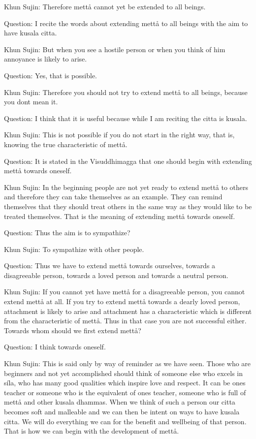 \documentclass[12pt,twoside]{article}
\begin{document}
Khun Sujin: Therefore mett{\aa} cannot yet be extended to all beings. 

Question: I recite the words about extending mett{\aa} to all beings
with the aim to have kusala citta. 

Khun Sujin: But when you see a hostile person or when you think of him
annoyance is likely to arise. 

Question: Yes, that is possible. 

Khun Sujin: Therefore you should not try to extend mett{\aa} to all
beings, because you don{\textquotesingle}t mean it. 

Question: I think that it is useful because while I am reciting the
citta is kusala. 

Khun Sujin: This is not possible if you do not start in the right way,
that is, knowing the true characteristic of mett{\aa}. 

Question: It is stated in the Visuddhimagga that one should begin with
extending mett{\aa} towards oneself. 

Khun Sujin: In the beginning people are not yet ready to extend
mett{\aa} to others and therefore they can take themselves as an
example. They can remind themselves that they should treat others in
the same way as they would like to be treated themselves. That is the
meaning of extending mett{\aa} towards oneself. 

Question: Thus the aim is to sympathize?

Khun Sujin: To sympathize with other people. 

Question: Thus we have to extend mett{\aa} towards ourselves, towards a
disagreeable person, towards a loved person and towards a neutral
person. 

Khun Sujin: If you cannot yet have mett{\aa} for a disagreeable person,
you cannot extend mett{\aa} at all. If you try to extend mett{\aa}
towards a dearly loved person, attachment is likely to arise and
attachment has a characteristic which is different from the
characteristic of mett{\aa}. Thus in that case you are not successful
either. Towards whom should we first extend mett{\aa}?

Question: I think towards oneself. 

Khun Sujin: This is said only by way of reminder as we have seen. Those
who are beginners and not yet accomplished should think of someone else
who excels in s\'ila, who has many good qualities which inspire love
and respect. It can be one{\textquotesingle}s teacher or someone who is
the equivalent of one{\textquotesingle}s teacher, someone who is full
of mett{\aa} and other kusala dhammas. When we think of such a person
our citta becomes soft and malleable and we can then be intent on ways
to have kusala citta. We will do everything we can for the benefit and
wellbeing of that person. That is how we can begin with the development
of mett{\aa}. 
\end{document}
